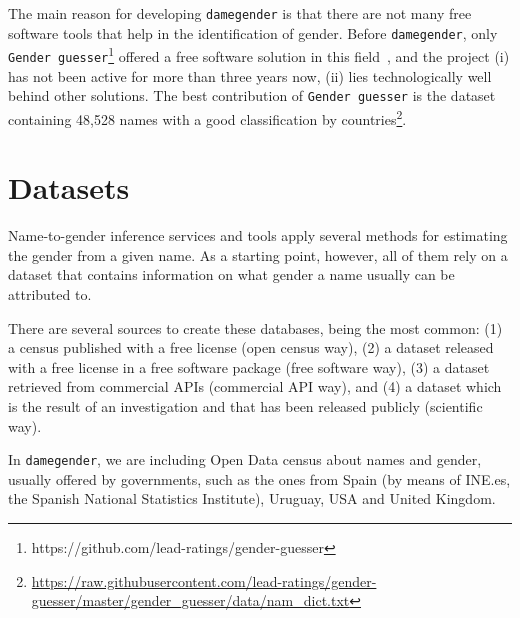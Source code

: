 \documentclass[a4paper]{article}
\begin{document}

The main reason for developing \texttt{damegender} is that there are not many free software tools that help in the identification of gender. 
Before \texttt{damegender}, only \texttt{Gender guesser}\footnote{https://github.com/lead-ratings/gender-guesser} offered a free software solution in this field~\cite{krawetz2006gender}, and the project (i) has not been active for more than three years now, (ii) lies technologically well behind other solutions.
The best contribution of \texttt{Gender guesser} is the dataset containing 48,528 names with a good classification by countries\footnote{\url{https://raw.githubusercontent.com/lead-ratings/gender-guesser/master/gender_guesser/data/nam_dict.txt}}.

\section{Datasets}
\label{sec:datasets}

Name-to-gender inference services and tools apply several methods for estimating the gender from a given name. 
As a starting point, however, all of them rely on a dataset that contains information on what gender a name usually can be attributed to.

There are several sources to create these databases, being the most common:  
(1) a census published with a free license (open census way), 
(2) a dataset released with a free license in a free software package (free software way), 
(3) a dataset retrieved from commercial APIs (commercial API way), and
(4) a dataset which is the result of an investigation and that has been released publicly (scientific way).

In \texttt{damegender}, we are including Open Data census about names and gender, usually offered by governments, such as the ones from Spain (by means of INE.es, the Spanish National Statistics Institute), Uruguay, USA and United Kingdom. 
\end{document}

